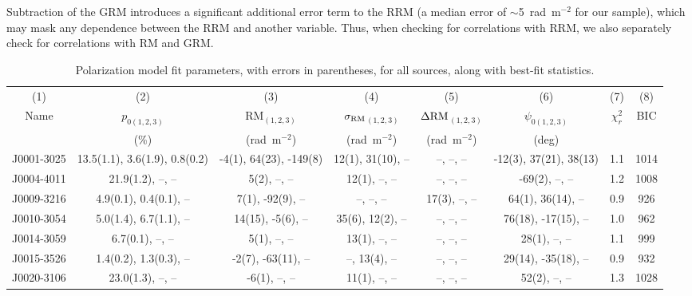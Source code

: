 \documentclass{mnras}
\newcommand*\sigmaRM{\sigma_{\rm RM}}
\newcommand*\DeltaRM{\Delta{\rm RM}}
\begin{document}
Subtraction of the GRM introduces a significant additional error term to the RRM (a median error of $\sim$5~rad~m$^{-2}$ for our sample), which may mask any dependence between the RRM and another variable. Thus, when checking for correlations with RRM, we also separately check for correlations with RM and GRM. 

\begin{table*}%
 \caption{Polarization model fit parameters, with errors in parentheses, for all sources, along with best-fit statistics.}
\scriptsize
 \centering
   \begin{tabular}{cccccccc}
    \hline\hline
       (1) & (2) & (3) & (4) & (5) & (6) & (7) & (8)  \\
      Name  & $p_{0(1,2,3)}$ & RM$_{(1,2,3)}$ & $\sigmaRM$$_{(1,2,3)}$ & $\DeltaRM$$_{(1,2,3)}$ & $\psi_{0(1,2,3)}$ & $\chi^2_{r}$ & BIC \\
                 &  (\%)               & (rad~m$^{-2}$) & (rad~m$^{-2}$)                 & (rad~m$^{-2}$)                &    (deg)               &                          &        \\
      \hline    
J0001-3025 & 13.5(1.1), 3.6(1.9), 0.8(0.2) & -4(1), 64(23), -149(8) & 12(1), 31(10), -- & --, --, -- & -12(3), 37(21), 38(13) & 1.1 & 1014 \\ 

J0004-4011 & 21.9(1.2), --, -- & 5(2), --, -- & 12(1), --, -- & --, --, -- & -69(2), --, -- & 1.2 & 1008 \\ 

J0009-3216 & 4.9(0.1), 0.4(0.1), -- & 7(1), -92(9), -- & --, --, -- & 17(3), --, -- & 64(1), 36(14), -- & 0.9 & 926 \\ 

J0010-3054 & 5.0(1.4), 6.7(1.1), -- & 14(15), -5(6), -- & 35(6), 12(2), -- & --, --, -- & 76(18), -17(15), -- & 1.0 & 962 \\ 

J0014-3059 & 6.7(0.1), --, -- & 5(1), --, -- & 13(1), --, -- & --, --, -- & 28(1), --, -- & 1.1 & 999 \\ 

J0015-3526 & 1.4(0.2), 1.3(0.3), -- & -2(7), -63(11), -- & --, 13(4), -- & --, --, -- & 29(14), -35(18), -- & 0.9 & 932 \\ 

J0020-3106 & 23.0(1.3), --, -- & -6(1), --, -- & 11(1), --, -- & --, --, -- & 52(2), --, -- & 1.3 & 1028 \\ 


\end{tabular}
\end{table*}
\end{document}
